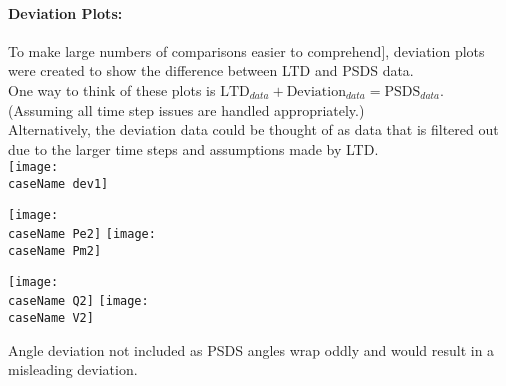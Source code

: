 \documentclass[12pt]{article}
\begin{document}
	\paragraph{Deviation Plots:} To make large numbers of comparisons easier to comprehend], deviation plots were created to show the difference between LTD and PSDS data.\\
	
	One way to think of these plots is $\text{LTD}_{data}+\text{Deviation}_{data} = \text{PSDS}_{data}$. \\(Assuming all time step issues are handled appropriately.)\\
	
	Alternatively, the deviation data could be thought of as data that is filtered out due to the larger time steps and assumptions made by LTD.\\
	
	\newcommand{\caseName}{miniWECCgenTrip027}
	\texttt{[image: \\caseName dev1]} 
	
	\texttt{[image: \\caseName Pe2]} %
	\texttt{[image: \\caseName Pm2]} 
	
	\texttt{[image: \\caseName Q2]} %
	\texttt{[image: \\caseName V2]} 
	
	Angle deviation not included as PSDS angles wrap oddly and would result in a misleading deviation.
\end{document}
